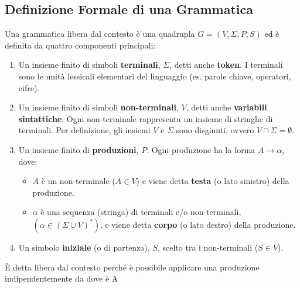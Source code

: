 \documentclass[a4paper, 11pt]{article}
\begin{document}
\subsection{Definizione Formale di una Grammatica }
Una grammatica libera dal contesto è una quadrupla $G = (V, \Sigma, P, S)$ ed è definita da quattro componenti principali:
\begin{enumerate}
    \item Un insieme finito di simboli \textbf{terminali}, $\Sigma$, detti anche \textbf{token}. I terminali sono le unità lessicali elementari del linguaggio (es. parole chiave, operatori, cifre).
    
    \item Un insieme finito di simboli \textbf{non-terminali}, $V$, detti anche \textbf{variabili sintattiche}. Ogni non-terminale rappresenta un insieme di stringhe di terminali. Per definizione, gli insiemi $V$ e $\Sigma$ sono disgiunti, ovvero $V \cap \Sigma = \emptyset$.
    
    \item Un insieme finito di \textbf{produzioni}, $P$. Ogni produzione ha la forma $A \rightarrow \alpha$, dove:
    \begin{itemize}
        \item $A$ è un non-terminale ($A \in V$) e viene detta \textbf{testa} (o lato sinistro) della produzione.
        \item $\alpha$ è una sequenza (stringa) di terminali e/o non-terminali, $(\alpha \in (\Sigma \cup V)^*)$, e viene detta \textbf{corpo} (o lato destro) della produzione.
    \end{itemize}
    
    \item Un simbolo \textbf{iniziale} (o di partenza), $S$, scelto tra i non-terminali ($S \in V$).

\end{enumerate}
È detta libera dal contesto perché è possibile applicare una produzione indipendentemente da dove è A
\end{document}
